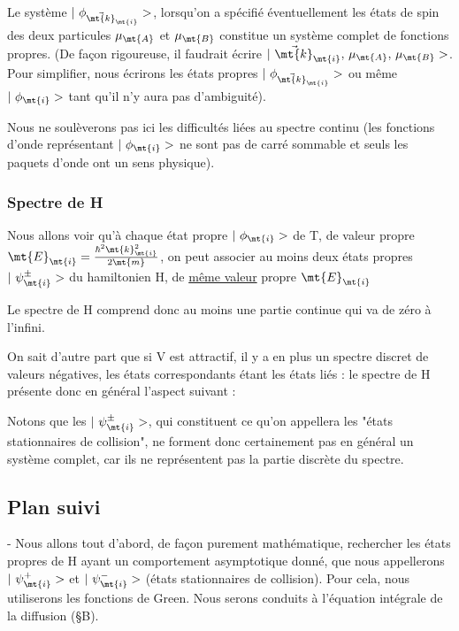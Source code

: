  
Le système $|\ \phi_{\vec{\mt{k}}_\mt{i}}>$, lorsqu'on a spécifié éventuellement les
états de spin des deux particules $\mu_\mt{A}$ et $\mu_\mt{B}$ constitue un système complet
de fonctions propres. (De façon rigoureuse, il faudrait écrire
$|\ \vec{\mt{k}}_\mt{i},\,\mu_\mt{A},\,\mu_\mt{B}>$.
Pour simplifier, nous écrirons les états propres $|\ \phi_{\vec{\mt{k}}_\mt{i}}>$
ou même $|\ \phi_\mt{i}>$ tant qu'il n'y aura pas d'ambiguité).

Nous ne soulèverons pas ici les difficultés liées au spectre
continu (les fonctions d'onde représentant $|\ \phi_\mt{i}>$ ne sont pas de carré
sommable et seuls les paquets d'onde ont un sens physique).

\subsubsection{Spectre de H}%
Nous allons voir qu'à chaque état propre $|\ \phi_\mt{i}>$ de T, de valeur propre
$\mt{E}_\mt{i}=\frac{\hbar^2\mt{k}_\mt{i}^2}{2\mt{m}}$, on peut associer au moins deux états propres
$|\ \psi_\mt{i}^\pm>$ du hamiltonien H, de \ul{même valeur} propre $\mt{E}_\mt{i}$

Le spectre de H comprend donc au moins une partie continue qui
va de zéro à l'infini.

On sait d'autre part que si V est attractif, il y a en plus un
spectre discret de valeurs négatives, les états correspondants étant les
états liés : le spectre de H présente donc en général l'aspect suivant :\begin{center}
 \end{center}

Notons que les $|\ \psi_\mt{i}^\pm>$, qui constituent ce qu'on appellera
les "états stationnaires de collision", ne forment donc certainement pas
en général un système complet, car ils ne représentent pas la partie
discrète du spectre.

\subsection{Plan suivi}%
- Nous allons tout d'abord, de façon purement mathématique, rechercher les états
propres de H ayant un comportement asymptotique donné,
que nous appellerons $|\ \psi_\mt{i}^+>$ et $|\ \psi_\mt{i}^->$ (états stationnaires de collision).
Pour cela, nous utiliserons les fonctions de Green. Nous serons conduits
à l'équation intégrale de la diffusion (\S B).


